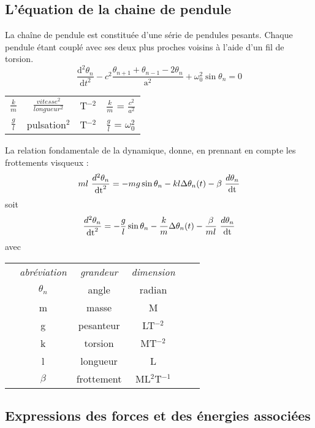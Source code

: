 \label{chaineDePendule}
\subsection{L'équation de la chaine de pendule}
La chaîne de pendule est constituée d'une série de pendules pesants. Chaque pendule étant couplé avec ses deux plus proches voisins à l'aide d'un fil de torsion.\cite{sine-gordon}\cite{chaine-pendule}
\[
\frac{\mathrm d^2\theta _n}{\mathrm d t^2} - c^2 \frac{\theta _{n+1} + \theta _{n-1} - 2 \theta _n}{\mathrm{a} ^2} + \omega _0 ^2 \sin \theta _n = 0
\]
%
\begin{center}
\begin{tabular}{cccc}
$\frac{k}{m}$ & $\frac{vitesse^2}{longueur^2}$ & T$^{-2}$ & $\frac{k}{m}$ = $\frac{c^2}{a^2}$ \\
$\frac{g}{l}$& pulsation$^2$ & T$^{-2}$ & $\frac{g}{l}$ = $\omega _0 ^2$ \\
\end{tabular}
\end{center}

La relation fondamentale de la dynamique, donne, en prennant en compte les frottements visqueux :
\[
m l\ \frac{d^2 \theta _n}{\dt^2} =  - m g \sin{\theta _n}  -  k l \Delta \theta _n(t)  -  \beta\ \frac{d \theta _n}{\dt}
\]
soit
\[
\frac{d^2 \theta _n}{\dt^2} =  - \frac{g}{l} \sin{\theta _n}  -  \frac{k}{m} \Delta \theta _n(t)  - \frac{\beta}{ml}\ \frac{d \theta _n}{\dt}
\]
avec
\begin{center}
\begin{tabular}{cccccc}
 & {\it abréviation} & {\it grandeur} & {\it dimension} &  \\
 & $\theta _n$ & angle & radian &  \\
 & m & masse & M &  \\
 & g & pesanteur & LT$^{-2}$ &  \\
 & k & torsion & MT$^{-2}$ &  \\
 & l & longueur & L &  \\
 & $\beta$ & frottement & ML$^{2}$T$^{-1}$ &  \\
\end{tabular}
\end{center}
%
\subsection{Expressions des forces et des énergies associées}

